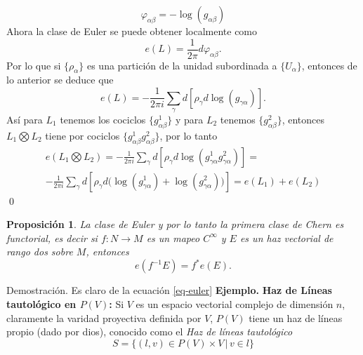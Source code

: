 \documentclass[letterpaper]{article}
\newtheorem{prop}[teorema]{Proposici\'on}
\newcommand{\eje}{{\newline \noindent \sc \textbf{Ejemplo. }}}
\newcommand{\dem}{{\noindent \sc Demostraci\'on. }}
\begin{document}
\[
    \varphi_{\alpha\beta}=-\log(g_{\alpha\beta})
\]
Ahora la clase de Euler se puede obtener localmente como
\[
    e(L)=\frac{1}{2\pi}d\varphi_{\alpha\beta}.
\]
Por lo que si \(\{\rho_{\alpha}\}\) es una partición de la unidad subordinada a \(\{U_{\alpha}\}\), entonces de lo anterior se deduce que
\begin{equation}\label{eq-euler}
    e(L)=-\frac{1}{2\pi i}\sum_{\gamma}d[\rho_{\gamma}d\log(g_{\gamma\alpha})].
\end{equation}
Así para \(L_1\) tenemos los cociclos \(\{g^{1}_{\alpha\beta}\}\) y para \(L_2\) tenemos \(\{g^{2}_{\alpha\beta}\}\), entonces \(L_1\bigotimes L_2\) tiene por cociclos \(\{g^{1}_{\alpha\beta}g^{2}_{\alpha\beta}\}\), por lo tanto
\begin{align*}
    e(L_1\bigotimes L_2)=-\frac{1}{2\pi i}\sum_{\gamma}d[\rho_{\gamma}d\log(g^{1}_{\gamma\alpha}g^{2}_{\gamma\alpha})]=\\
    -\frac{1}{2\pi i}\sum_{\gamma}d[\rho_{\gamma}d\big(\log(g^{1}_{\gamma\alpha})+\log(g^{2}_{\gamma\alpha})\big)]=e(L_1)+e(L_2)
\end{align*}
\qed
\begin{prop}
La clase de Euler y por lo tanto la primera clase de Chern es functorial, es decir si $f:N\rightarrow M$ es un mapeo $C^{\infty}$ y $E$ es un haz vectorial de rango dos sobre $M$, entonces
\[
    e(f^{-1}E)=f^{*}e(E).
\]
\end{prop}
\dem Es claro de la ecuación \ref{eq-euler}
\eje \textbf{Haz de Líneas tautológico en \(P(V)\):} Si \(V\) es un espacio vectorial complejo de dimensión \(n\), claramente la varidad proyectiva definida por \(V\), \(P(V)\) tiene un haz de líneas propio (dado por dios), conocido como el \emph{Haz de líneas tautológico}
\[
    S=\{(l,v)\in P(V)\times V \,|\, v\in l \}
\]
\end{document}

